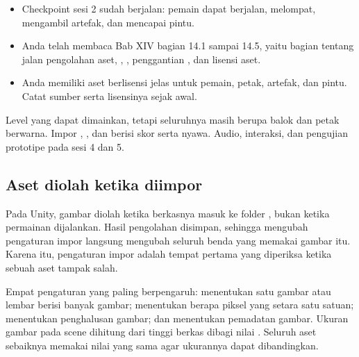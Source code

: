 \begin{prasyaratbox}
\begin{itemize}[leftmargin=1.4em, itemsep=0.25em]
  \item Checkpoint sesi 2 sudah berjalan: pemain dapat berjalan, melompat,
        mengambil artefak, dan mencapai pintu.
  \item Anda telah membaca Bab XIV bagian 14.1 sampai 14.5, yaitu bagian
        tentang jalan pengolahan aset, , ,
        penggantian , dan lisensi aset.
  \item Anda memiliki aset  berlisensi jelas untuk pemain,
        petak, artefak, dan pintu. Catat sumber serta lisensinya sejak awal.
\end{itemize}
\end{prasyaratbox}


\petasesi
  {Level yang dapat dimainkan, tetapi seluruhnya masih berupa balok dan petak
   berwarna.}
  {Impor , , dan  berisi
   skor serta nyawa.}
  {Audio,  interaksi, dan pengujian prototipe pada sesi 4
   dan 5.}


\subsection*{Aset diolah ketika diimpor}

Pada Unity, gambar diolah ketika berkasnya masuk ke folder , bukan
ketika permainan dijalankan. Hasil pengolahan disimpan, sehingga mengubah
pengaturan impor langsung mengubah seluruh benda yang memakai gambar itu.
Karena itu, pengaturan impor adalah tempat pertama yang diperiksa ketika sebuah
aset tampak salah.

Empat pengaturan yang paling berpengaruh:  menentukan satu
gambar atau lembar berisi banyak gambar;  menentukan
berapa piksel yang setara satu satuan;  menentukan
penghalusan gambar; dan  menentukan pemadatan gambar.
Ukuran gambar pada scene dihitung dari tinggi berkas dibagi nilai
. Seluruh aset sebaiknya memakai nilai yang sama agar
ukurannya dapat dibandingkan.

